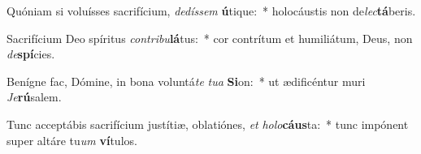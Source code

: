 \item Quóniam si voluísses sacrifícium, \textit{de}\textit{dís}\textit{sem} \textbf{ú}tique:~* holocáustis non de\textit{lec}\textbf{tá}beris.
\item Sacrifícium Deo spíritus \textit{con}\textit{tri}\textit{bu}\textbf{lá}tus:~* cor contrítum et humiliátum, Deus, non \textit{de}\textbf{spí}cies.
\item Benígne fac, Dómine, in bona voluntá\textit{te} \textit{tu}\textit{a} \textbf{Si}on:~* ut ædificéntur muri \textit{Je}\textbf{rú}salem.
\item Tunc acceptábis sacrifícium justítiæ, oblatiónes, \textit{et} \textit{ho}\textit{lo}\textbf{cáus}ta:~* tunc impónent super altáre tu\textit{um} \textbf{ví}tulos.
